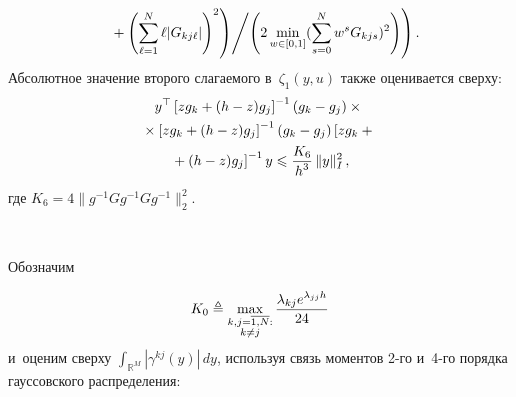 \begin{multicols}{2}
\begin{multline*}
\left.\left.{}+
\left(\sum\limits_{\ell=1}^N\ell |G_{kj\ell}|\right)^2
\right)\!\Bigg/ \!\left(2\min\limits_{w \in [0,1]}
(\sum\limits_{s=0}^N w^sG_{kjs})^2\right)
\vphantom{\left(\sum\limits_{\ell=1}^N\ell |G_{kj\ell}|\right)^{\!2}}
\!\right).\hspace*{-5pt}
 \end{multline*}
 Абсолютное значение второго слагаемого в~$\zeta_1(y,u)$ также 
оценивается сверху:
 \begin{multline*}
 y^{\top}\left[z g_k+(h-z)g_j\right]^{-1}\left( g_k-g_j\right)\times{}\\
 {}\times \left[z g_k+(h-z)g_j\right]^{-1}
 ( g_k-g_j)\left[z g_k+{}\right.\\
\left. {}+(h-z)g_j\right]^{-1}y \leqslant
 \displaystyle\frac{\displaystyle K_6\mathstrut}{\displaystyle h^3\mathstrut}\,\|y\|^2_I\,,
 \end{multline*}
 где $K_6 = 4 \|g^{-1}Gg^{-1}Gg^{-1}\|^2_2$.


\begin{figure*} %
\vspace*{1pt}
 \begin{center}
 \mbox{%
 \epsfxsize=162.006mm 
 }
 \end{center}
   \vspace*{-9pt}
   \begin{minipage}[t]{80mm}
\end{minipage}
\label{pic:pic1}
\hfill
    \vspace*{-9pt}
       \begin{minipage}[t]{80mm}
 \label{pic:pic3}
\end{minipage}
\vspace*{12pt}
\end{figure*}


 Обозначим 
 
 \noindent
 $$
 K_0 \triangleq 
\max\limits_{\substack{{k,j=\overline{1,N}:}\\ {k \neq 
j}}}\displaystyle\frac{\displaystyle \lambda_{kj}e^{\lambda_{jj}h}\mathstrut}{\displaystyle 24\mathstrut}
$$ 
и~оценим сверху
 $\int_{\mathbb{R}^M}|\gamma^{kj}(y)|\,dy$, используя связь моментов \mbox{2-го} 
и~4-го порядка гауссовского распределения:


\end{multicols}
